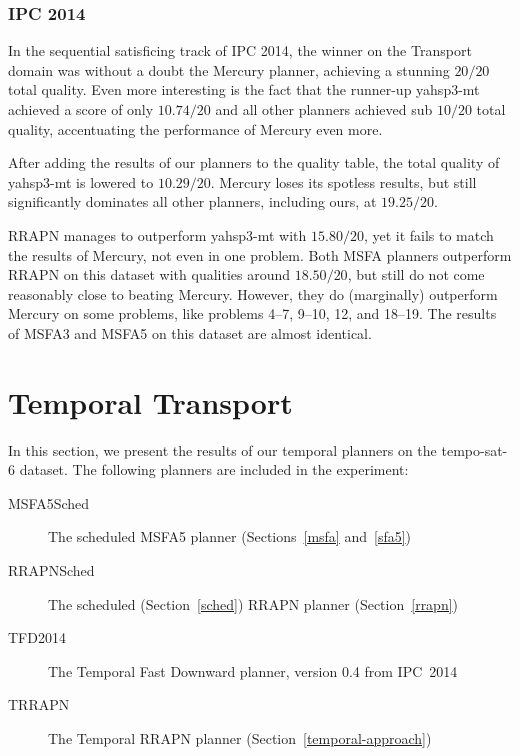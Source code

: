 \subsubsection{IPC 2014}

In the sequential satisficing track of IPC 2014, the winner on the Transport domain
was without a doubt the Mercury planner, achieving
a stunning $20/20$ total quality. Even more interesting is the fact that
the runner-up yahsp3-mt achieved a score of only $10.74/20$
and all other planners achieved sub $10/20$ total quality,
accentuating the performance of Mercury even more.

After adding the results of our planners to the quality table,
the total quality of yahsp3-mt is lowered to $10.29/20$.
Mercury loses its spotless results, but still significantly dominates all
other planners, including ours, at $19.25/20$.

RRAPN manages to outperform yahsp3-mt with $15.80/20$, yet it fails
to match the results of Mercury, not even in one problem.
Both MSFA planners outperform RRAPN on this dataset with qualities around $18.50/20$,
but still do not come reasonably close to beating Mercury.
However, they do (marginally) outperform Mercury on some problems, like
problems 4--7, 9--10, 12, and 18--19.
The results of MSFA3 and MSFA5 on this dataset are almost identical.

















\section{Temporal Transport}

In this section, we present the results of our temporal planners on the tempo-sat-6 dataset. The following planners are included in the experiment:
\begin{description}
\item[MSFA5Sched] The scheduled MSFA5 planner (Sections~\ref{msfa} and~\ref{sfa5})
\item[RRAPNSched] The scheduled (Section~\ref{sched}) RRAPN planner (Section~\ref{rrapn})
\item[TFD2014] The Temporal Fast Downward planner, version 0.4 from IPC~2014 \citep[Preferring Preferred Operators in Temporal Fast Downward]{Vallati2015}
\item[TRRAPN] The Temporal RRAPN planner (Section~\ref{temporal-approach})
\end{description}

